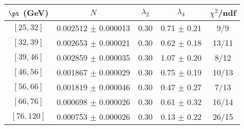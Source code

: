 \begin{tabular}{c||c|c|c|c}
$\pt$ (GeV) & $N$ & $\lambda_{2}$ & $\lambda_4$  & $\chi^2$/ndf  \\
\hline
$[25, 32]$ & 0.002512 $\pm$ 0.000013 & 0.30 & 0.71 $\pm$ 0.21 & 9/9\\
$[32, 39]$ & 0.002653 $\pm$ 0.000021 & 0.30 & 0.62 $\pm$ 0.18 & 13/11\\
$[39, 46]$ & 0.002859 $\pm$ 0.000035 & 0.30 & 1.07 $\pm$ 0.20 & 8/12\\
$[46, 56]$ & 0.001867 $\pm$ 0.000029 & 0.30 & 0.75 $\pm$ 0.19 & 10/13\\
$[56, 66]$ & 0.001819 $\pm$ 0.000046 & 0.30 & 0.47 $\pm$ 0.27 & 7/13\\
$[66, 76]$ & 0.000698 $\pm$ 0.000026 & 0.30 & 0.61 $\pm$ 0.32 & 16/14\\
$[76, 120]$ & 0.000753 $\pm$ 0.000026 & 0.30 & 0.13 $\pm$ 0.22 & 26/15\\
\end{tabular}
